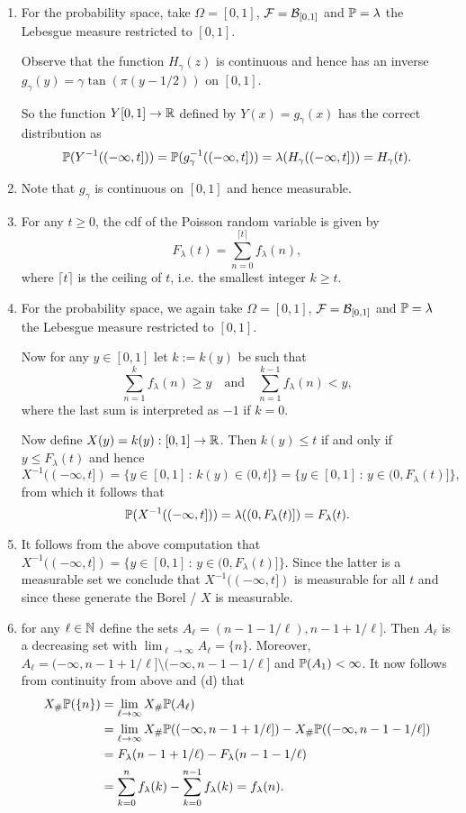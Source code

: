 \begin{enumerate}[label=(\alph*)]
\item For the probability space, take $\Omega = [0,1]$, $\mathcal F = \mathcal B_{[0,1]}$ and $\mathbb P = \lambda$ the Lebesgue measure restricted to $[0,1]$. 

Observe that the function $H_\gamma(z)$ is continuous and hence has an inverse $g_\gamma(y) = \gamma \tan(\pi(y - 1/2))$ on $[0,1]$.

So the function $Y [0,1] \to \mathbb R$ defined by $Y(x) = g_\gamma(x)$ has the correct distribution as
\[
	\mathbb P(Y^{-1}((-\infty,t])) = \mathbb P(g_\gamma^{-1}((-\infty, t])) = \lambda(H_\gamma((-\infty,t])) = H_\gamma(t).
\]
\item Note that $g_\gamma$ is continuous on $[0,1]$ and hence measurable.
\item For any $t \ge 0$, the cdf of the Poisson random variable is given by
\[
	F_\lambda(t) = \sum_{n = 0}^{\lceil t \rceil} f_\lambda(n),
\]
where $\lceil t \rceil$ is the ceiling of $t$, i.e. the smallest integer $k \ge t$.
\item For the probability space, we again take $\Omega = [0,1]$, $\mathcal F = \mathcal B_{[0,1]}$ and $\mathbb P = \lambda$ the Lebesgue measure restricted to $[0,1]$. 

Now for any $y \in [0,1]$ let $k := k(y)$ be such that
\[
	\sum_{n = 1}^k f_\lambda(n) \ge y \quad \text{and} \quad \sum_{n = 1}^{k-1} f_\lambda(n) < y,
\]
where the last sum is interpreted as $-1$ if $k=0$.

Now define $X(y) = k(y) : [0,1] \to \mathbb R$. Then $k(y) \le t$ if and only if $y \le F_\lambda(t)$ and hence
\[
	X^{-1}((-\infty,t]) = \{y \in [0,1] \, : \, k(y) \in (0,t]\}
	= \{y \in [0,1] \, : \, y \in (0, F_\lambda(t)]\},
\]
from which it follows that
\[
	\mathbb P(X^{-1}((-\infty,t])) = \lambda((0, F_\lambda(t)]) = F_\lambda(t).
\]
\item It follows from the above computation that $X^{-1}((-\infty,t]) = \{y \in [0,1] \, : \, y \in (0, F_\lambda(t)]\}$. Since the latter is a measurable set we conclude that $X^{-1}((-\infty,t])$ is measurable for all $t$ and since these generate the Borel \sigalg/ $X$ is measurable.
\item for any $\ell \in \mathbb N$ define the sets $A_\ell = (n-1-1/\ell), n-1 + 1/\ell]$. Then $A_\ell$ is a decreasing set with $\lim_{\ell \to \infty} A_\ell = \{n\}$. Moreover, $A_\ell = (-\infty,n-1+1/\ell] \setminus (-\infty, n-1-1/\ell]$ and $\mathbb P(A_1) < \infty$. It now follows from continuity from above and (d) that
\begin{align*}
	X_\#\mathbb P(\{n\}) &= \lim_{\ell \to \infty} X_\# \mathbb P(A_\ell) \\
	&= \lim_{\ell \to \infty} X_\# \mathbb P((-\infty,n-1+1/\ell])
	- X_\# \mathbb P((-\infty,n-1-1/\ell]) \\
	&= F_\lambda(n-1+1/\ell) - F_\lambda(n-1-1/\ell) \\
	&= \sum_{k = 0}^{n} f_\lambda(k) - \sum_{k = 0}^{n-1} f_\lambda(k) = f_\lambda(n).
\end{align*}
\end{enumerate}

